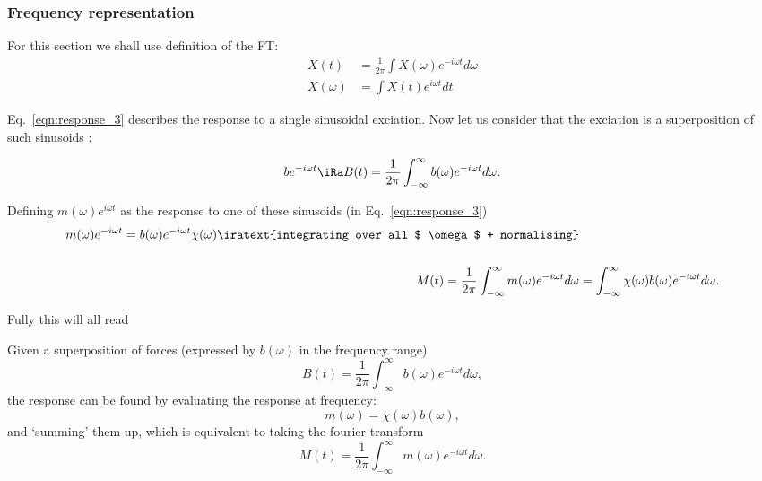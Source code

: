 \newpage\subsubsection{Frequency representation}
\begin{framed}\noindent
  For this section we shall use definition of the FT:
  \[
    \begin{aligned}X(t) & = \frac{1}{2\pi}\int X(\omega)e^{-i\omega t}d\omega\\
      X(\omega) & = \int X(t)e^{i\omega t}dt
    \end{aligned}
  \]

\end{framed}
Eq.~\eqref{eqn:response_3}   describes  the   response   to  a   single
sinusoidal  exciation. Now  let us  consider  that the  exciation is  a
superposition of such sinusoids :

   \begin{equation}
     be^{-i\omega t} \iRa B(t) = \frac{1}{2\pi}\int_{-\infty}^{\infty}b(\omega)e^{-i\omega t}d\omega.
   \end{equation}

   Defining  $ m(\omega)e^{i\omega  t} $  as the  response to  one of  these
   sinusoids (in
   Eq.~\eqref{eqn:response_3}) %
   \begin{equation}\label{eqn:freq_1}
     \begin{aligned}
       {m(\omega)e^{-i\omega      t}      =     b(\omega)e^{-i\omega      t}\chi(\omega)}
       \iratext{integrating         over         all        $         \omega
         $      +      normalising}       &\\\\      \      M(t)      =
       \frac{1}{2\pi}\int_{-\infty}^{\infty}m(\omega)e^{-i\omega   t}d\omega   &=
       \int_{-\infty}^{\infty}\chi(\omega)b(\omega)e^{-i\omega t}d\omega.
     \end{aligned}
   \end{equation}

   \noindent Fully this will all read

\begin{framed}\noindent
  Given  a superposition  of  forces  (expressed by  $  b(\omega)  $ in  the
  frequency range)
  \begin{equation}\label{eqn:freq_2}
    B(t) = \frac{1}{2\pi}\int_{-\infty}^{\infty}b(\omega)e^{-i\omega t}d\omega,
  \end{equation}
  \noindent the  response can  be found by  evaluating the  response at
  frequency:
  \begin{equation}\label{eqn:freq_3}
    m(\omega) = \chi(\omega)b(\omega),
  \end{equation}
  \noindent and  `summing' them up,  which is equivalent to  taking the
  fourier transform
  \begin{equation}\label{eqn:freq_4}
    M(t) = \frac{1}{2\pi}\int_{-\infty}^{\infty}m(\omega)e^{-i\omega t}d\omega.
  \end{equation}
\end{framed}

